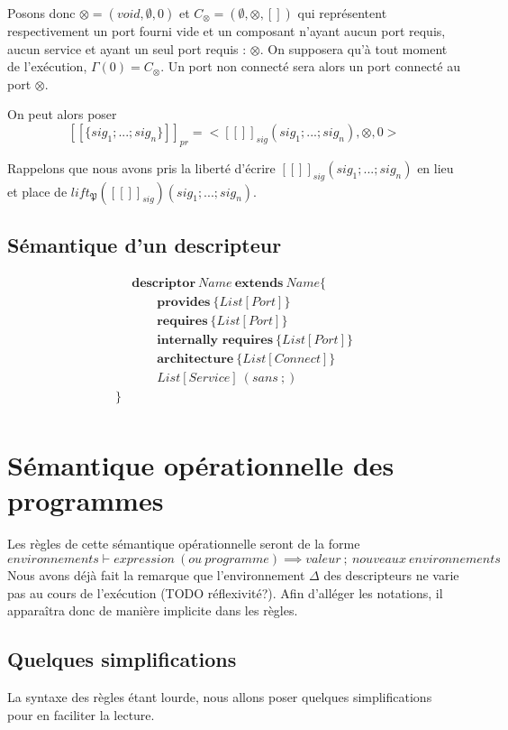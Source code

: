 \documentclass[11pt,a4paper,fleqn]{report}
\begin{document}
Posons donc $\otimes = (void,\emptyset,0)$ et $C_{\otimes} = (\emptyset,{\otimes},[])$ qui représentent respectivement un port fourni vide et un composant n'ayant aucun port requis, aucun service et ayant un seul port requis : $\otimes$. On supposera qu'à tout moment de l'exécution, $\Gamma(0) = C_\otimes$. Un port non connecté sera alors un port connecté au port $\otimes$.

On peut alors poser 
\[[\![\{sig_1; ... ; sig_n\}]\!]_{pr} = <[\![]\!]_{sig}(sig_1; ... ; sig_n), \otimes, 0>
\]

Rappelons que nous avons pris la liberté d'écrire $[\![]\!]_{sig}(sig_1; ... ; sig_n)$ en lieu et place de $lift_\mathfrak{P}([\![]\!]_{sig})(sig_1; ... ; sig_n)$.


\subsection{Sémantique d'un descripteur}

\begin{align*}
&\textbf{descriptor} ~ Name ~ \textbf{extends} ~ Name\{ \\
&\qquad\textbf{provides}~\{List[Port]\} \\
&\qquad\textbf{requires}~\{List[Port]\} \\
&\qquad\textbf{internally~requires}~\{List[Port]\} \\
&\qquad\textbf{architecture}~\{List[Connect]\} \\
&\qquad List[Service]~(sans~;) \\
\}  \\
\end{align*}


\section{Sémantique opérationnelle des programmes}
Les règles de cette sémantique opérationnelle seront de la forme
\[environnements \vdash expression~(ou~programme) \implies valeur~;~nouveaux~environnements\]
Nous avons déjà fait la remarque que l'environnement $\Delta$ des descripteurs ne varie pas au cours de l'exécution (TODO réflexivité?). Afin d'alléger les notations, il apparaîtra donc de manière implicite dans les règles.

\subsection{Quelques simplifications}
La syntaxe des règles étant lourde, nous allons poser quelques simplifications pour en faciliter la lecture.
\end{document}
